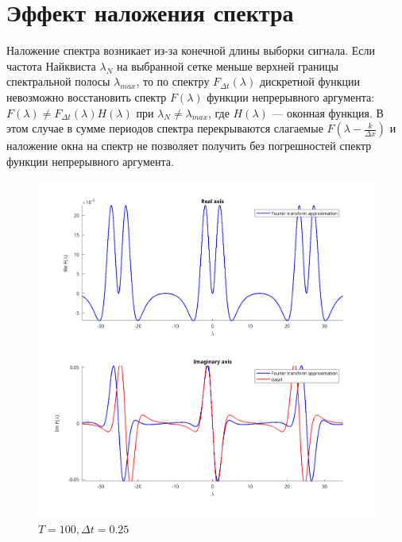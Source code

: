 
\section{Эффект наложения спектра}
Наложение спектра возникает из-за конечной длины выборки сигнала. Если частота
Найквиста $\lambda_N$ на выбранной сетке меньше верхней границы спектральной полосы $ \lambda_{max}$, то по спектру $F_{\Delta t}(\lambda)$ дискретной функции невозможно восстановить спектр $F(\lambda)$ функции непрерывного аргумента: \\
$F(\lambda) \neq F_{\Delta t}(\lambda)H(\lambda)$ при $\lambda_N \neq \lambda_{max}$, где
$H(\lambda)$ — оконная функция. 
В этом случае в сумме периодов спектра перекрываются слагаемые
$F(\lambda - \frac{k}{\Delta x})$ и наложение окна на спектр не позволяет получить без погрешностей спектр функции непрерывного аргумента. \\

\begin{figure}[h]
\centering
\includegraphics[width=\textwidth, height=0.5\textheight]{Aliasing-3}
\caption{$ T = 100, \Delta t = 0.25 $}
\end{figure}

\newpage

